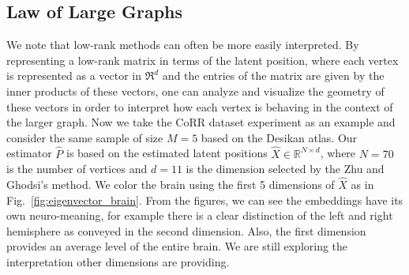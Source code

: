 \documentclass[simplex.tex]{subfiles}
\begin{document}
\subsection{Law of Large Graphs}
We note that low-rank methods can often be more easily interpreted.
By representing a low-rank matrix in terms of the latent position, where each vertex is represented as a vector in $\Re^d$ and the entries of the matrix are given by the inner products of these vectors, one can analyze and visualize the geometry of these vectors in order to interpret how each vertex is behaving in the context of the larger graph. 
Now we take the CoRR dataset experiment as an example and consider the same sample of size $M=5$ based on the Desikan atlas. Our estimator $\hat{P}$ is based on the estimated latent positions $\hat{X} \in \mathbb{R}^{N\times d}$, where $N=70$ is the number of vertices and $d=11$ is the dimension selected by the Zhu and Ghodsi's method. 
We color the brain using the first 5 dimensions of $\hat{X}$ as in Fig.~\ref{fig:eigenvector_brain}. 
From the figures, we can see the embeddings have its own neuro-meaning, for example there is a clear distinction of the left and right hemisphere as conveyed in the second dimension. Also, the first dimension provides an average level of the entire brain. We are still exploring the interpretation other dimensions are providing.
\end{document}
